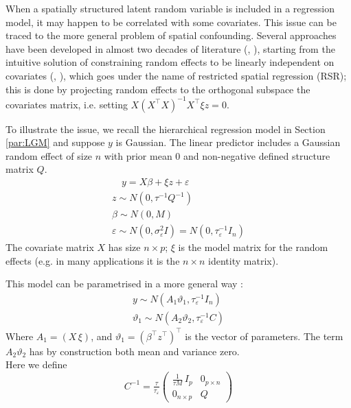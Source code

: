 \documentclass[openany]{book}
\begin{document}



When a spatially structured latent random variable is included in a regression model, it may happen to be correlated with some covariates. This issue can be traced to the more general problem of spatial confounding. Several approaches have been developed in almost two decades of literature (\citep{Urdangarin23}, \citep{DupontArXiv}), starting from the intuitive solution of constraining random effects to be linearly independent on covariates (\citep{RHZ}, \cite{Hodges}), which goes under the name of restricted spatial regression (RSR); this is done by projecting random effects to the orthogonal subspace the covariates matrix, i.e. setting $X(X^{\top}X)^{-1}X^{\top} \xi z = 0$.

To illustrate the issue, we recall the hierarchical regression model in Section \ref{par:LGM} and suppose $y$ is Gaussian. The linear predictor includes a Gaussian random effect of size $n$ with prior mean $0$ and non-negative defined structure matrix $Q$.
%
\begin{equation}
\begin{aligned}
\quad y = X \beta + \xi z + \varepsilon \\
z \sim N (0, \tau^{-1} Q^{-1}) \\
\beta \sim N(0, M)\\
\varepsilon \sim N(0, \sigma_{\varepsilon}^2 I)= N(0, \tau_{\varepsilon}^{-1}I_n)
\end{aligned}
\end{equation}
%
The covariate matrix $X$ has size $n \times p$; $\xi$ is the model matrix for the random effects (e.g. in many applications it is the $n \times n$ identity matrix).

This model can be parametrised in a more general way \citep[see e.g.][]{DIC}:
%
\begin{equation}
\begin{aligned}
y \sim N(A_1 \vartheta_1,\tau_{\varepsilon}^{-1} I_n ) \\
\vartheta_1 \sim N(A_2  \vartheta_2,\tau_{\varepsilon}^{-1} C)
\end{aligned}
\end{equation}
%
Where  $A_1 = (X \, \xi)$, and $\vartheta_1 = (\beta^{\top} z^{\top})^{\top}$ is the vector of parameters. The term $A_2 \vartheta_2$ has by construction both mean and variance zero.\\
Here we define
$$ 
C^{-1} = \tfrac{\tau}{\tau_{\varepsilon}} \begin{pmatrix}
 \frac{1}{\tau M} \, I_p & 0_{p \times n} \\ 0_{n \times p} & Q
\end{pmatrix}
$$
\end{document}
